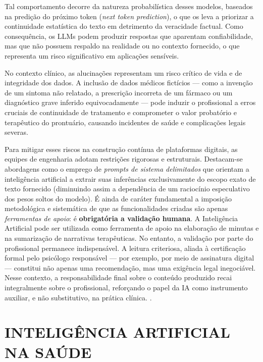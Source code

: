 Tal comportamento decorre da natureza probabilística desses modelos, baseados na predição do próximo token (\textit{next token prediction}), o que os leva a priorizar a continuidade estatística do texto em detrimento da veracidade factual. Como consequência, os LLMs podem produzir respostas que aparentam confiabilidade, mas que não possuem respaldo na realidade ou no contexto fornecido, o que representa um risco significativo em aplicações sensíveis.

No contexto clínico, as alucinações representam um risco crítico de vida e de integridade dos dados. A inclusão de dados médicos fictícios — como a invenção de um sintoma não relatado, a prescrição incorreta de um fármaco ou um diagnóstico grave inferido equivocadamente — pode induzir o profissional a erros cruciais de continuidade de tratamento e comprometer o valor probatório e terapêutico do prontuário, causando incidentes de saúde e complicações legais severas.

Para mitigar esses riscos na construção contínua de plataformas digitais, as equipes de engenharia adotam restrições rigorosas e estruturais. Destacam-se abordagens como o emprego de \textit{prompts de sistema delimitados} que orientam a inteligência artificial a extrair suas inferências exclusivamente do escopo exato de texto fornecido (diminuindo assim a dependência de um raciocínio especulativo dos pesos soltos do modelo). É ainda de caráter fundamental a imposição metodológica e sistemática de que as funcionalidades criadas são apenas \textit{ferramentas de apoio}: é \textbf{obrigatória a validação humana}. A Inteligência Artificial pode ser utilizada como ferramenta de apoio na elaboração de minutas e na sumarização de narrativas terapêuticas. No entanto, a validação por parte do profissional permanece indispensável. A leitura criteriosa, aliada à certificação formal pelo psicólogo responsável — por exemplo, por meio de assinatura digital — constitui não apenas uma recomendação, mas uma exigência legal inegociável. Nesse contexto, a responsabilidade final sobre o conteúdo produzido recai integralmente sobre o profissional, reforçando o papel da IA como instrumento auxiliar, e não substitutivo, na prática clínica. \cite{silva2023desafios}.

\fi

\section{INTELIGÊNCIA ARTIFICIAL NA SAÚDE}

